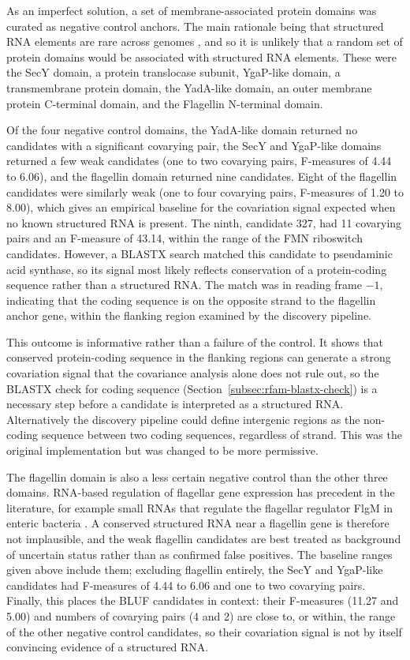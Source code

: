 As an imperfect solution, a set of membrane-associated protein domains was curated as negative control anchors.
The main rationale being that structured RNA elements are rare across genomes \citep{Geissler2026,Weinberg2015}, and so it is unlikely that a random set of protein domains would be associated with structured RNA elements.
These were the SecY domain, a protein translocase subunit, YgaP-like domain, a transmembrane protein domain, the YadA-like domain, an outer membrane protein C-terminal domain, and the Flagellin N-terminal domain.

Of the four negative control domains, the YadA-like domain returned no candidates with a significant covarying pair, the SecY and YgaP-like domains returned a few weak candidates (one to two covarying pairs, F-measures of 4.44 to 6.06), and the flagellin domain returned nine candidates.
Eight of the flagellin candidates were similarly weak (one to four covarying pairs, F-measures of 1.20 to 8.00), which gives an empirical baseline for the covariation signal expected when no known structured RNA is present.
The ninth, candidate 327, had 11 covarying pairs and an F-measure of 43.14, within the range of the \ac{FMN} riboswitch candidates.
However, a BLASTX search matched this candidate to pseudaminic acid synthase, so its signal most likely reflects conservation of a protein-coding sequence rather than a structured RNA.
The match was in reading frame $-1$, indicating that the coding sequence is on the opposite strand to the flagellin anchor gene, within the flanking region examined by the discovery pipeline.

This outcome is informative rather than a failure of the control.
It shows that conserved protein-coding sequence in the flanking regions can generate a strong covariation signal that the covariance analysis alone does not rule out, so the BLASTX check for coding sequence (Section~\ref{subsec:rfam-blastx-check}) is a necessary step before a candidate is interpreted as a structured RNA.
Alternatively the discovery pipeline could define intergenic regions as the non-coding sequence between two coding sequences, regardless of strand.
This was the original implementation but was changed to be more permissive.

The flagellin domain is also a less certain negative control than the other three domains.
RNA-based regulation of flagellar gene expression has precedent in the literature, for example small RNAs that regulate the flagellar regulator FlgM in enteric bacteria \citep{Mika2013}.
A conserved structured RNA near a flagellin gene is therefore not implausible, and the weak flagellin candidates are best treated as background of uncertain status rather than as confirmed false positives.
The baseline ranges given above include them; excluding flagellin entirely, the SecY and YgaP-like candidates had F-measures of 4.44 to 6.06 and one to two covarying pairs.
Finally, this places the \ac{BLUF} candidates in context: their F-measures (11.27 and 5.00) and numbers of covarying pairs (4 and 2) are close to, or within, the range of the other negative control candidates, so their covariation signal is not by itself convincing evidence of a structured RNA.

